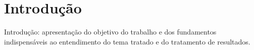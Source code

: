 \section{Introdução}

Introdução: apresentação do objetivo do trabalho e dos fundamentos indispensáveis ao entendimento do tema tratado e do tratamento de resultados.